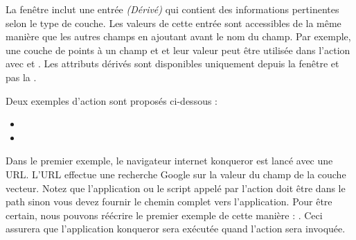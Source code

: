 La fenêtre  inclut une entrée {\em (Dérivé)} qui contient des informations pertinentes selon le type de couche. Les valeurs de cette entrée sont accessibles de la même manière que les autres champs en ajoutant  avant le nom du champ. Par exemple, une couche de points à un champ  et  et leur valeur peut être utilisée dans l'action avec  et . Les attributs dérivés sont disponibles uniquement depuis la fenêtre  et pas la .

Deux exemples d'action sont proposés ci-dessous : 

\begin{itemize}[label=--]
  \item {}
  \item {}
\end{itemize}

Dans le premier exemple, le navigateur internet konqueror est lancé avec une URL. L'URL effectue une recherche Google sur la valeur du champ  de la couche vecteur. Notez que l'application ou le script appelé par l'action doit être dans le path sinon vous devez fournir le chemin complet vers l'application. Pour être certain, nous pouvons réécrire le premier exemple de cette manière : . Ceci assurera que l'application konqueror sera exécutée quand l'action sera invoquée.

